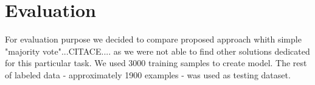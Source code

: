 \documentclass{acm_proc_article-sp}
\begin{document}
{    \section{Evaluation}
 For evaluation purpose we decided to compare proposed approach whith simple "majority vote"...CITACE.... as we were 
 not able to find other solutions dedicated for this particular task. We used 3000 training samples to create model. 
 The rest of labeled data - approximately 1900 examples - was used as testing dataset.
 


}
\end{document}
